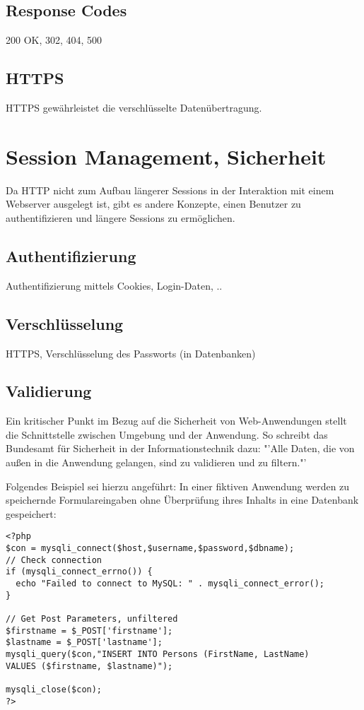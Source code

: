 \documentclass[12pt]{report}
\begin{document}
\subsection{Response Codes}
200 OK, 302, 404, 500
\subsection{HTTPS}
HTTPS gewährleistet die verschlüsselte Datenübertragung.

\section{Session Management, Sicherheit}
Da HTTP nicht zum Aufbau längerer Sessions in der Interaktion mit einem Webserver ausgelegt ist, gibt es andere Konzepte, einen Benutzer zu authentifizieren und längere Sessions zu ermöglichen.
\subsection{Authentifizierung}
Authentifizierung mittels Cookies, Login-Daten, ..
\subsection{Verschlüsselung}
HTTPS, Verschlüsselung des Passworts (in Datenbanken)
\subsection{Validierung}
Ein kritischer Punkt im Bezug auf die Sicherheit von Web-Anwendungen stellt die Schnittstelle zwischen Umgebung und der Anwendung. \cite[S.212]{ebooks:Architekturen} So schreibt das Bundesamt für Sicherheit in der Informationstechnik dazu: "'Alle Daten, die von außen in die Anwendung gelangen, sind zu validieren und zu filtern."'
\cite[S.20]{BSI}

Folgendes Beispiel sei hierzu angeführt: 
In einer fiktiven Anwendung werden zu speichernde Formulareingaben ohne Überprüfung ihres Inhalts in eine Datenbank gespeichert:

\begin{lstlisting}
<?php
$con = mysqli_connect($host,$username,$password,$dbname);
// Check connection
if (mysqli_connect_errno()) {
  echo "Failed to connect to MySQL: " . mysqli_connect_error();
}

// Get Post Parameters, unfiltered
$firstname = $_POST['firstname'];
$lastname = $_POST['lastname'];
mysqli_query($con,"INSERT INTO Persons (FirstName, LastName)
VALUES ($firstname, $lastname)");

mysqli_close($con);
?>
\end{lstlisting}
\end{document}
